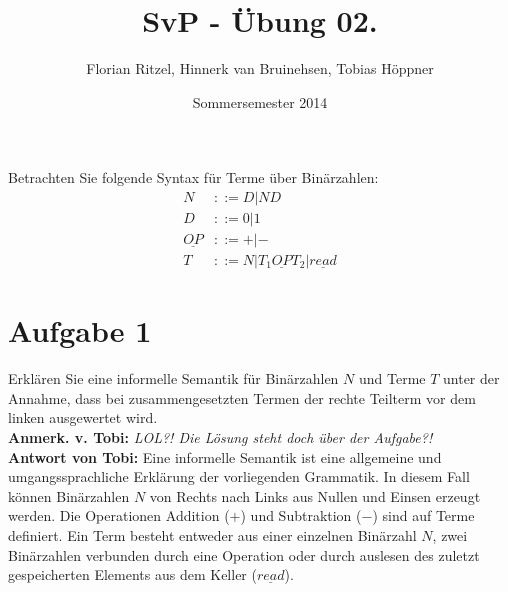 \documentclass[ngerman,a4paper]{report}
\author{Florian Ritzel, Hinnerk van Bruinehsen, Tobias Höppner}
\title{SvP - Übung 02. }
\date{Sommersemester 2014}
\renewcommand{\maketitle}{}
\begin{document}
\maketitle
Betrachten Sie folgende Syntax für Terme über Binärzahlen:
\begin{align*}
N &::= D | ND \\
D &::= 0 | 1 \\
\underline{OP} &::= + | - \\
T &::= N | T_1 \underline{OP}  T_2 | \underline{read}
\end{align*}
\section*{Aufgabe 1}
Erklären Sie eine informelle Semantik für Binärzahlen $N$ und Terme $T$ unter der Annahme, dass bei zusammengesetzten Termen der rechte Teilterm vor dem linken ausgewertet wird.\\
\textbf{Anmerk. v. Tobi:} \emph{LOL?! Die Lösung steht doch über der Aufgabe?!}\\
\textbf{Antwort von Tobi:} Eine informelle Semantik ist eine allgemeine und umgangssprachliche Erklärung der vorliegenden Grammatik. In diesem Fall können Binärzahlen $N$ von Rechts nach Links aus Nullen und Einsen erzeugt werden. Die Operationen Addition ($+$) und Subtraktion ($-$) sind auf Terme definiert. Ein Term besteht entweder aus einer einzelnen Binärzahl $N$, zwei Binärzahlen verbunden durch eine Operation oder durch auslesen des zuletzt gespeicherten Elements aus dem Keller ($\underline{read}$).\\
\end{document}
